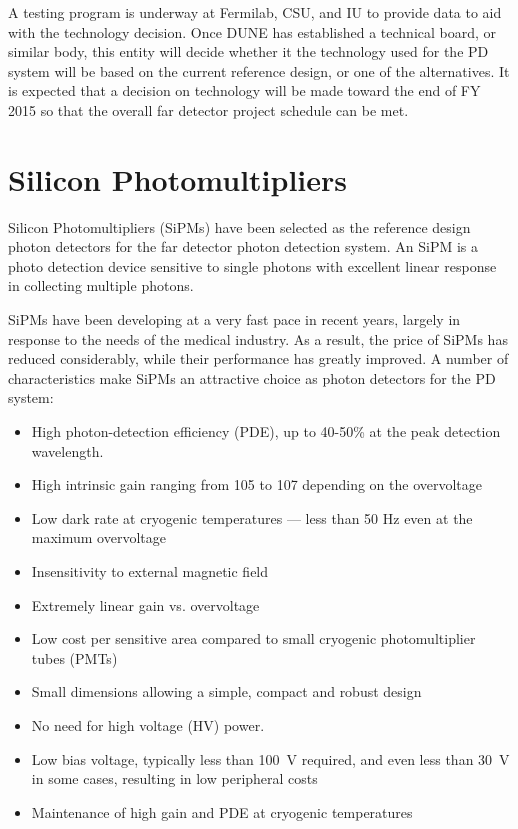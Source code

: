 A testing program is underway at Fermilab, CSU, and IU to provide data
to aid with the technology decision. Once DUNE has established a
technical board, or similar body, this entity will decide whether it
the technology used for the PD system will be based on the current
reference design, or one of the alternatives. It is expected that a
decision on technology will be made toward the end of FY 2015 so that
the overall far detector project schedule can be met. 

\section{Silicon Photomultipliers}

Silicon Photomultipliers (SiPMs) have been selected as the reference
design photon detectors for the far detector photon detection
system. An SiPM is a photo detection device sensitive to single
photons with excellent linear response in collecting multiple photons.

SiPMs have been developing at a very fast pace in recent years,
largely in response to the needs of the medical industry. As a result,
the price of SiPMs has reduced considerably, while their performance
has greatly improved. A number of characteristics make SiPMs an
attractive choice as photon detectors for the PD system:

\begin{itemize}

\item{High photon-detection efficiency (PDE), up to 40-50\% at the
  peak detection wavelength. }
\item{High intrinsic gain ranging from 105 to 107 depending on the
  overvoltage}
\item{Low dark rate at cryogenic temperatures --- less than 50 Hz even
  at the maximum overvoltage}
\item{Insensitivity to external magnetic field}
\item{Extremely linear gain vs. overvoltage}
\item{Low cost per sensitive area compared to small cryogenic
  photomultiplier tubes (PMTs)}
\item{Small dimensions allowing a simple, compact and robust design}
\item{No need for high voltage (HV) power.}
\item{Low bias voltage, typically less than 100~V required, and even
  less than 30~V in some cases, resulting in low peripheral costs}
\item{Maintenance of high gain and PDE at cryogenic temperatures}

\end{itemize}


